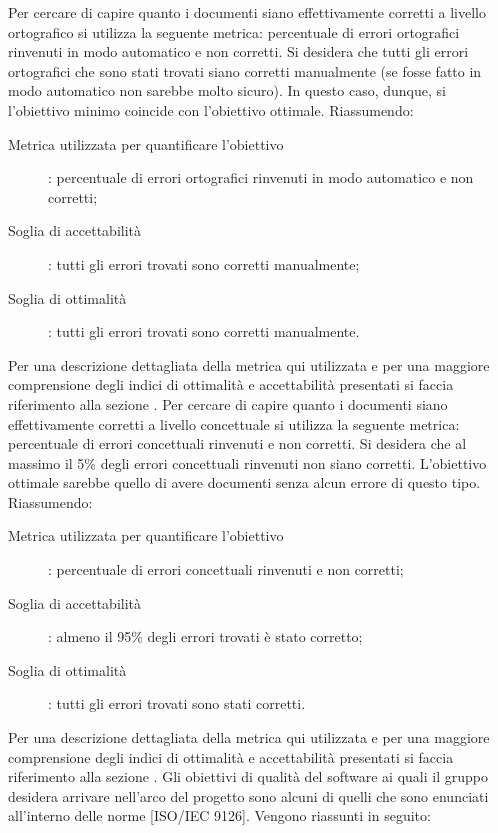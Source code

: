 					Per cercare di capire quanto i documenti siano effettivamente corretti a livello ortografico si utilizza la seguente metrica: percentuale di errori ortografici rinvenuti in modo automatico e non corretti. Si desidera che tutti gli errori ortografici che sono stati trovati siano corretti manualmente (se fosse fatto in modo automatico non sarebbe molto sicuro). In questo caso, dunque, si l'obiettivo minimo coincide con l'obiettivo ottimale. Riassumendo:
					\begin{description}
						\item[Metrica utilizzata per quantificare l'obiettivo]: percentuale di errori ortografici rinvenuti in modo automatico e non corretti;
						\item[Soglia di accettabilità]: tutti gli errori trovati sono corretti manualmente;
						\item[Soglia di ottimalità]: tutti gli errori trovati sono corretti manualmente.
					\end{description}
					Per una descrizione dettagliata della metrica qui utilizzata e per una maggiore comprensione degli indici di ottimalità e accettabilità presentati si faccia riferimento alla sezione .
					Per cercare di capire quanto i documenti siano effettivamente corretti a livello concettuale si utilizza la seguente metrica: percentuale di errori concettuali rinvenuti e non corretti. Si desidera che al massimo il 5\% degli errori concettuali rinvenuti non siano corretti. L'obiettivo ottimale sarebbe quello di avere documenti senza alcun errore di questo tipo. Riassumendo:
					\begin{description}
						\item[Metrica utilizzata per quantificare l'obiettivo]: percentuale di errori concettuali rinvenuti e non corretti;
						\item[Soglia di accettabilità]: almeno il 95\% degli errori trovati è stato corretto;
						\item[Soglia di ottimalità]: tutti gli errori trovati sono stati corretti.
					\end{description}
					Per una descrizione dettagliata della metrica qui utilizzata e per una maggiore comprensione degli indici di ottimalità e accettabilità presentati si faccia riferimento alla sezione .
				Gli obiettivi di qualità del software ai quali il gruppo \groupname{} desidera arrivare nell'arco del progetto sono alcuni di quelli che sono enunciati all'interno delle norme [ISO/IEC 9126]. Vengono riassunti in seguito:
